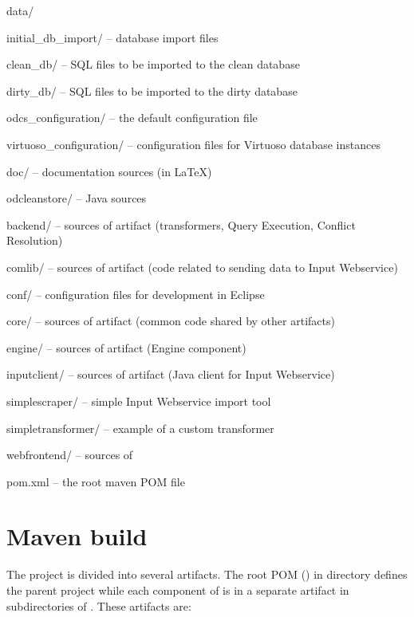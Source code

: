 \begin{dirlist}
	\item[data/] \mbox{}
		\begin{dirlist}
			\item[initial\_db\_import/] -- database import files
				\begin{dirlist}
					\item[clean\_db/] -- SQL files to be imported to the clean database
					\item[dirty\_db/] -- SQL files to be imported to the dirty database
				\end{dirlist}
			\item[odcs\_configuration/] -- the default \odcs configuration file
			\item[virtuoso\_configuration/] -- configuration files for Virtuoso database instances
		\end{dirlist}
	\item[doc/] -- documentation sources (in \LaTeX)
	\item[odcleanstore/] -- Java sources
		\begin{dirlist}
			\item[backend/] -- sources of  artifact (transformers, Query Execution, Conflict Resolution)
			\item[comlib/] -- sources of  artifact (code related to sending data to Input Webservice)
			\item[conf/] -- configuration files for development in Eclipse
			\item[core/] -- sources of  artifact (common code shared by other artifacts)
			\item[engine/]  -- sources of  artifact (Engine component)
			\item[inputclient/]  -- sources of  artifact (Java client for Input Webservice)
			\item[simplescraper/]  -- simple Input Webservice import tool
			\item[simpletransformer/]  -- example of a custom transformer
			\item[webfrontend/]  -- sources of \FE
			\item[pom.xml] -- the root maven POM file
		\end{dirlist}
\end{dirlist}


\section{Maven build}
\label{sec:mavenBuild}
The project is divided into several artifacts. The root POM () in  directory defines the parent project while each component of \odcs is in a separate artifact in subdirectories of . These artifacts are:

